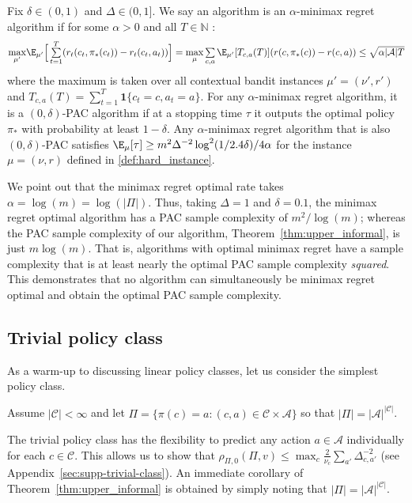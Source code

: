 \documentclass{article}
\newcommand{\mc}[1]{\mathcal{#1}}
\newcommand{\lalit}[1]{\textcolor{blue}{}}
\newcommand{\1}{\mathbf{1}}
\renewcommand{\v}{r} %
\begin{document}
\begin{theorem}\label{thm:inefficient-low-regret}
Fix $\delta \in (0,1)$ and $\Delta\in (0,1]$. 
We say an algorithm is an $\alpha$-minimax regret algorithm  if for some $\alpha > 0$ and all $T \in \mathbb{N}$ :
\begin{equation*}
\textstyle\underset{\mu'}{\max} \E_{\mu'}\Big[ \sum\limits_{t=1}^T ( r_t(c_t,\pi_*(c_t)) - r_t(c_t,a_t) ) \Big] = \underset{\mu}{\max} \sum\limits_{c,a} \E_{\mu'}[ T_{c,a}(T) ] ( r(c,\pi_*(c)) - r(c,a) ) \leq \sqrt{\alpha |\mc{A}| T}
\end{equation*}
where the maximum is taken over all contextual bandit instances $\mu'=(\nu', \v')$ and $T_{c,a}(T) = \sum_{t=1}^T \1\{ c_t = c, a_t = a \}$.
For any $\alpha$-minimax regret algorithm, it is a $(0,\delta)$-PAC algorithm if at a stopping time $\tau$ it outputs the optimal policy $\pi_*$ with probability at least $1-\delta$.
 Any $\alpha$-minimax regret algorithm that is also $(0,\delta)$-PAC satisfies $\E_\mu[\tau] \geq m^2 \Delta^{-2} \log^2(1/2.4\delta) / 4 \alpha$ for the instance $\mu = (\nu, r)$ defined in \ref{def:hard_instance}.
\end{theorem}
\noindent We point out that the minimax regret optimal rate takes $\alpha = \log(m)=\log(|\Pi|)$.
Thus, taking $\Delta = 1$ and $\delta=0.1$, the minimax regret optimal algorithm has a PAC sample complexity of $m^2 / \log(m)$; whereas the PAC sample complexity of our algorithm, Theorem~\ref{thm:upper_informal}, is just $m \log(m)$.
That is, algorithms with optimal minimax regret have a sample complexity that is at least nearly the optimal PAC sample complexity \emph{squared}.
This demonstrates that no algorithm can simultaneously be minimax regret optimal and obtain the optimal PAC sample complexity. 



\subsection{Trivial policy class}\label{sec:trivial}

As a warm-up to discussing linear policy classes, let us consider the simplest policy class.
\begin{definition}
Assume $|\mc{C}| < \infty$ and let $\Pi = \{ \pi(c) = a : (c,a) \in \mc{C} \times \mc{A}\}$ so that $|\Pi| = |\mc{A}|^{|\mc{C}|}$.
\end{definition}
\noindent The trivial policy class has the flexibility to predict any action $a \in \mc{A}$ individually for each $c \in \mc{C}$. This allows us to show that $\rho_{\Pi,0}(\Pi, v)\leq \max_c \frac{2}{\nu_c} \sum_{a'} \Delta_{c,a'}^{-2}$ (see Appendix~\ref{sec:supp-trivial-class}). An immediate corollary of Theorem~\ref{thm:upper_informal} is obtained by simply noting that $|\Pi| = |\mc{A}|^{|\mc{C}|}$.
\end{document}
